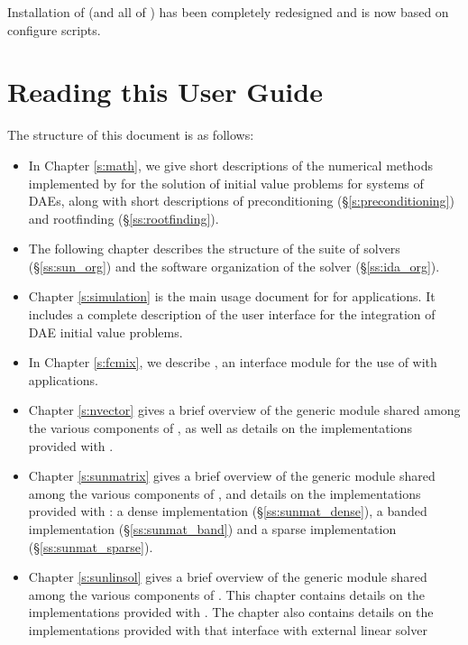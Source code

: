 Installation of {\ida} (and all of {\sundials}) has been completely 
redesigned and is now based on configure scripts.


\section{Reading this User Guide}\label{ss:reading}

The structure of this document is as follows:
\begin{itemize}
\item
  In Chapter \ref{s:math}, we give short descriptions of the numerical 
  methods implemented by {\ida} for the solution of initial value problems
  for systems of DAEs, along with short descriptions of preconditioning
  (\S\ref{s:preconditioning}) and rootfinding (\S\ref{ss:rootfinding}).
\item
  The following chapter describes the structure of the {\sundials} suite
  of solvers (\S\ref{ss:sun_org}) and the software organization of the {\ida}
  solver (\S\ref{ss:ida_org}). 
\item
  Chapter \ref{s:simulation} is the main usage document for {\ida} for
  {\CC} applications.  It includes a complete description of the user interface
  for the integration of DAE initial value problems.
\item
  In Chapter \ref{s:fcmix}, we describe {\fida}, an interface module
  for the use of {\ida} with {\F} applications.
\item
  Chapter \ref{s:nvector} gives a brief overview of the generic {\nvector} module 
  shared among the various components of {\sundials}, as well as details on the 
  {\nvector} implementations provided with {\sundials}.
\item
Chapter \ref{s:sunmatrix} gives a brief overview of the generic
  {\sunmatrix} module shared among the various components of
  {\sundials}, and details on the {\sunmatrix} implementations
  provided with {\sundials}: 
  a dense implementation (\S\ref{ss:sunmat_dense}),
  a banded implementation (\S\ref{ss:sunmat_band}) and
  a sparse implementation (\S\ref{ss:sunmat_sparse}).
\item
  Chapter \ref{s:sunlinsol} gives a brief overview of the generic
  {\sunlinsol} module shared among the various components of
  {\sundials}.  This chapter contains details on the {\sunlinsol}
  implementations provided with {\sundials}.
  The chapter
  also contains details on the {\sunlinsol} implementations provided
  with {\sundials} that interface with external linear solver

\end{itemize}
